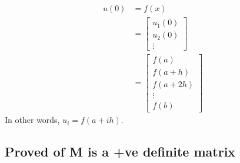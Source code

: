 \documentclass{article}
\begin{document}
\begin{align}
  u(0) &= f(x) \\
      &= \begin{bmatrix}
        u_1(0) \\ u_2(0) \\ \vdots
      \end{bmatrix} \\
      &= \begin{bmatrix}
        f(a) \\ f(a+h) \\ f(a+2h) \\ \vdots \\ f(b)
      \end{bmatrix}
\end{align}
In other words, $u_i = f(a + ih)$.




\subsection{Proved of M is a +ve definite matrix}%
\label{sub:Proved of M is a +ve definite matrix}
\end{document}
